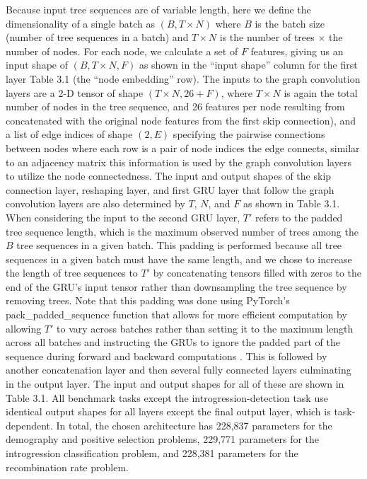Because input tree sequences are of variable length, here we define the dimensionality of a single batch as $(B, T\times N)$ where $B$ is the batch size (number of tree sequences in a batch) and $T \times N$ is the number of trees $\times$ the number of nodes. For each node, we calculate a set of $F$ features, giving us an input shape of $(B, T \times N, F)$ as shown in the “input shape” column for the first layer Table 3.1 (the “node embedding” row). The inputs to the graph convolution layers are a 2-D tensor of shape $(T \times N, 26+F)$, where $T\times N$ is again the total number of nodes in the tree sequence, and 26 features per node resulting from concatenated with the original node features from the first skip connection), and a list of edge indices of shape $(2, E)$ specifying the pairwise connections between nodes where each row is a pair of node indices the edge connects, similar to an adjacency matrix this information is used by the graph convolution layers to utilize the node connectedness. The input and output shapes of the skip connection layer, reshaping layer, and first GRU layer that follow the graph convolution layers are also determined by $T$, $N$, and $F$ as shown in Table 3.1. When considering the input to the second GRU layer, $T'$ refers to the padded tree sequence length, which is the maximum observed number of trees among the $B$ tree sequences in a given batch. This padding is performed because all tree sequences in a given batch must have the same length, and we chose to increase the length of tree sequences to $T'$ by concatenating tensors filled with zeros to the end of the GRU's input tensor rather than downsampling the tree sequence by removing trees. Note that this padding was done using PyTorch's pack\_padded\_sequence function that allows for more efficient computation by allowing $T'$ to vary across batches rather than setting it to the maximum length across all batches and instructing the GRUs to ignore the padded part of the sequence during forward and backward computations \cite{paszkePyTorchImperativeStyle2019}. This is followed by another concatenation layer and then several fully connected layers culminating in the output layer. The input and output shapes for all of these are shown in Table 3.1. All benchmark tasks except the introgression-detection task use identical output shapes for all layers except the final output layer, which is task-dependent. In total, the chosen architecture has 228,837 parameters for the demography and positive selection problems, 229,771 parameters for the introgression classification problem, and 228,381 parameters for the recombination rate problem.

